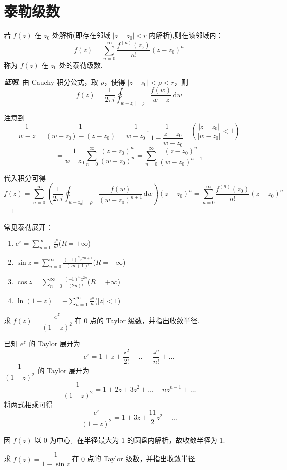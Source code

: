 \documentclass[openany,oneside]{ctexbook}
\begin{document}
\section{泰勒级数}
\begin{theorem}
若 $f(z)$ 在 $z_0$ 处解析(即存在邻域 $|z - z_0| < r$ 内解析),则在该邻域内：
\[
f(z) = \sum_{n=0}^\infty \frac{f^{(n)}(z_0)}{n!}(z - z_0)^n
\]
称为 $f(z)$ 在 $z_0$ 处的泰勒级数.
\end{theorem}
\begin{proof}[\textbf{证明}]
    由 Cauchy 积分公式，取 $\rho$，使得 $|z-z_0|<\rho<r$，则
\[
f(z) = \frac{1}{2\pi i} \oint_{|w-z_0|=\rho} \frac{f(w)}{w-z} \, \mathrm{d}w
\]

\noindent
注意到
\[
\frac{1}{w-z}
= \frac{1}{(w-z_0) - (z-z_0)}
= \frac{1}{w-z_0} \cdot \frac{1}{1-\dfrac{z-z_0}{w-z_0}}
\quad \left( \frac{|z-z_0|}{|w-z_0|} < 1 \right)
\]
\[
= \frac{1}{w-z_0} \sum_{n=0}^{\infty} \frac{(z-z_0)^n}{(w-z_0)^n}
= \sum_{n=0}^{\infty} \frac{(z-z_0)^n}{(w-z_0)^{n+1}}
\]

\noindent
代入积分可得
\[
f(z)
= \sum_{n=0}^{\infty} \left( \frac{1}{2\pi i} \oint_{|w-z_0|=\rho} \frac{f(w)}{(w-z_0)^{n+1}} \, \mathrm{d}w \right) (z-z_0)^n
= \sum_{n=0}^{\infty} \frac{f^{(n)}(z_0)}{n!} (z-z_0)^n
\]

\end{proof}
常见泰勒展开：
\begin{enumerate}
  \item $e^z = \sum_{n=0}^\infty \frac{z^n}{n!}$($R = +\infty$)
  \item $\sin z = \sum_{n=0}^\infty \frac{(-1)^n z^{2n+1}}{(2n+1)!}$($R = +\infty$)
  \item $\cos z = \sum_{n=0}^\infty \frac{(-1)^n z^{2n}}{(2n)!}$($R = +\infty$)
  \item $\ln(1 - z) = -\sum_{n=1}^\infty \frac{z^n}{n}$($|z| < 1$)
\end{enumerate}
\begin{example}
求 \( f(z)=\dfrac{e^z}{(1-z)^2} \) 在 \( 0 \) 点的 Taylor 级数，并指出收敛半径.
\end{example}

\begin{solution}
已知 \( e^z \) 的 Taylor 展开为
\[
e^z = 1 + z + \frac{z^2}{2!} + \dots + \frac{z^n}{n!} + \dots
\]
\( \dfrac{1}{(1-z)^2} \) 的 Taylor 展开为
\[
\frac{1}{(1-z)^2} = 1 + 2z + 3z^2 + \dots + nz^{n-1} + \dots
\]
将两式相乘可得
\[
\frac{e^z}{(1-z)^2} = 1 + 3z + \frac{11}{2}z^2 + \dots
\]

因 \( f(z) \) 以 \( 0 \) 为中心，在半径最大为 \( 1 \) 的圆盘内解析，故收敛半径为 \( 1 \).
\end{solution}
\begin{example}
求 \( f(z)=\dfrac{1}{1-\sin z} \) 在 \( 0 \) 点的 Taylor 级数，并指出收敛半径.
\end{example}
\end{document}
